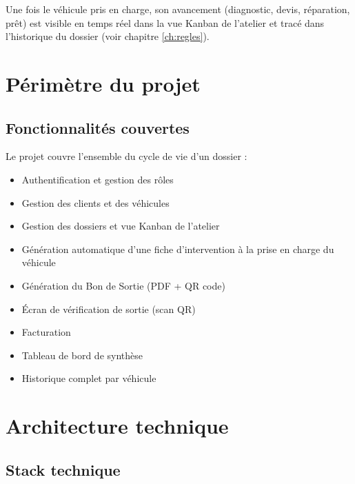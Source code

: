 \documentclass[11pt,a4paper]{report}
\begin{document}
Une fois le véhicule pris en charge, son avancement (diagnostic, devis, réparation,
prêt) est visible en temps réel dans la vue Kanban de l'atelier et tracé dans
l'historique du dossier (voir chapitre \ref{ch:regles}).

\chapter{Périmètre du projet}

\section{Fonctionnalités couvertes}

Le projet couvre l'ensemble du cycle de vie d'un dossier :

\begin{itemize}[leftmargin=1cm]
\item Authentification et gestion des rôles
\item Gestion des clients et des véhicules
\item Gestion des dossiers et vue Kanban de l'atelier
\item Génération automatique d'une fiche d'intervention à la prise en charge du véhicule
\item Génération du Bon de Sortie (PDF + QR code)
\item Écran de vérification de sortie (scan QR)
\item Facturation
\item Tableau de bord de synthèse
\item Historique complet par véhicule
\end{itemize}

\chapter{Architecture technique}

\section{Stack technique}
\end{document}
